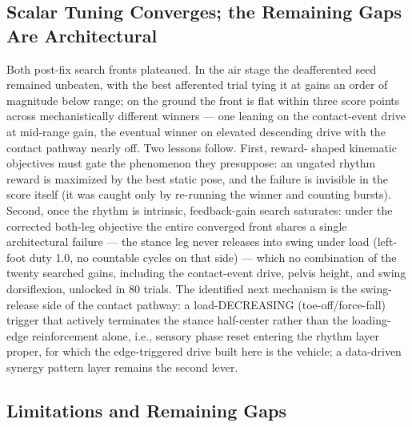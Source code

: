\subsection{Scalar Tuning Converges; the Remaining Gaps Are
Architectural}

Both post-fix search fronts plateaued. In the air stage the
deafferented seed remained unbeaten, with the best afferented trial
tying it at gains an order of magnitude below range; on the ground the
front is flat within three score points across mechanistically
different winners --- one leaning on the contact-event drive at
mid-range gain, the eventual winner on elevated descending drive with
the contact pathway nearly off. Two lessons follow. First, reward-
shaped kinematic objectives must gate the phenomenon they presuppose:
an ungated rhythm reward is maximized by the best static pose, and the
failure is invisible in the score itself (it was caught only by
re-running the winner and counting bursts). Second, once the rhythm
is intrinsic, feedback-gain search saturates: under the corrected
both-leg objective the entire converged front shares a single
architectural failure — the stance leg never releases into swing
under load (left-foot duty 1.0, no countable cycles on that side) —
which no combination of the twenty searched gains, including the
contact-event drive, pelvis height, and swing dorsiflexion,
unlocked in 80 trials. The identified next mechanism is the
swing-release side of the contact pathway: a load-DECREASING
(toe-off/force-fall) trigger that actively terminates the stance
half-center rather than the loading-edge reinforcement alone, i.e.,
sensory phase reset entering the rhythm layer proper, for which the
edge-triggered drive built here is the vehicle; a data-driven
synergy pattern layer remains the second lever.

\subsection{Limitations and Remaining Gaps}

